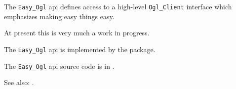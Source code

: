 
The {\tt Easy\_Ogl} api defines access to a high-level {\tt Ogl\_Client} interface 
which emphasizes making easy things easy.

At present this is very much a work in progress.

The {\tt Easy\_Ogl} api is implemented by the  package.

The {\tt Easy\_Ogl} api source code is in .

See also:  .



